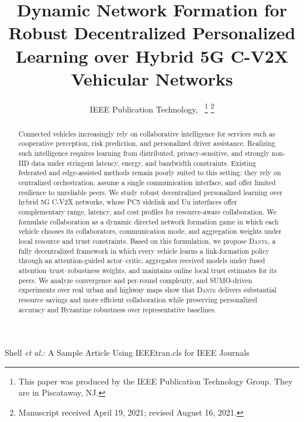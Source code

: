 \documentclass[lettersize,journal]{IEEEtran}
\begin{document}
\title{Dynamic Network Formation for Robust Decentralized Personalized Learning over Hybrid 5G C-V2X Vehicular Networks}

\author{IEEE Publication Technology,~
	\thanks{This paper was produced by the IEEE Publication Technology Group. They are in Piscataway, NJ.}%
	\thanks{Manuscript received April 19, 2021; revised August 16, 2021.}}

%
{Shell \MakeLowercase{\textit{et al.}}: A Sample Article Using IEEEtran.cls for IEEE Journals}


\maketitle

\begin{abstract}
	Connected vehicles increasingly rely on collaborative intelligence for services such as cooperative perception, risk prediction, and personalized driver assistance. Realizing such intelligence requires learning from distributed, privacy-sensitive, and strongly non-IID data under stringent latency, energy, and bandwidth constraints. Existing federated and edge-assisted methods remain poorly suited to this setting: they rely on centralized orchestration, assume a single communication interface, and offer limited resilience to unreliable peers. We study robust decentralized personalized learning over hybrid 5G C-V2X networks, whose PC5 sidelink and Uu interfaces offer complementary range, latency, and cost profiles for resource-aware collaboration. We formulate collaboration as a dynamic directed network formation game in which each vehicle chooses its collaborators, communication mode, and aggregation weights under local resource and trust constraints. Based on this formulation, we propose \textsc{Dante}, a fully decentralized framework in which every vehicle learns a link-formation policy through an attention-guided actor--critic, aggregates received models under fused attention--trust--robustness weights, and maintains online local trust estimates for its peers. We analyze convergence and per-round complexity, and SUMO-driven experiments over real urban and highway maps show that \textsc{Dante} delivers substantial resource savings and more efficient collaboration while preserving personalized accuracy and Byzantine robustness over representative baselines.
\end{abstract}
\end{document}

